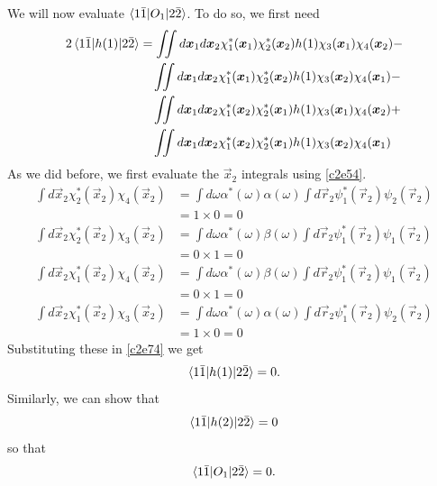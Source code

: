 We will now evaluate $\braket{1\bar{1}|O_1|2\bar{2}}$. To do so, we first need
\begin{equation}\label{c2e74}
\begin{aligned}
2\braket{1\bar{1}|h(1)|2\bar{2}} &= \iint d\bm{x}_1d\bm{x}_2
\chi_1^\ast(\bm{x}_1)\chi_2^\ast(\bm{x}_2)h(1)\chi_3(\bm{x}_1)\chi_4(\bm{x}_2)
- \\
 &\quad \iint d\bm{x}_1d\bm{x}_2
\chi_1^\ast(\bm{x}_1)\chi_2^\ast(\bm{x}_2)h(1)\chi_3(\bm{x}_2)\chi_4(\bm{x}_1)-
\\
 &\quad  \iint d\bm{x}_1d\bm{x}_2
\chi_1^\ast(\bm{x}_2)\chi_2^\ast(\bm{x}_1)h(1)\chi_3(\bm{x}_1)\chi_4(\bm{x}_2) +
\\
 &\quad  \iint d\bm{x}_1d\bm{x}_2
\chi_1^\ast(\bm{x}_2)\chi_2^\ast(\bm{x}_1)h(1)\chi_3(\bm{x}_2)\chi_4(\bm{x}_1)
\end{aligned}
\end{equation}
As we did before, we first evaluate the $\vec{x}_2$ integrals using \eqref{c2e54}.
\[
\begin{aligned}
\int d\vec{x}_2\chi_2^\ast(\vec{x}_2)\chi_4(\vec{x}_2) &= 
\int d\omega \alpha^\ast(\omega)\alpha(\omega)\int d\vec{r}_2\psi_1^\ast(\vec{r}_2)
\psi_2(\vec{r}_2) \\
 &= 1 \times 0 = 0 \\
\int d\vec{x}_2\chi_2^\ast(\vec{x}_2)\chi_3(\vec{x}_2) &= 
\int d\omega \alpha^\ast(\omega)\beta(\omega)\int d\vec{r}_2\psi_1^\ast(\vec{r}_2)
\psi_1(\vec{r}_2) \\
 &= 0 \times 1 = 0 \\
\int d\vec{x}_2\chi_1^\ast(\vec{x}_2)\chi_4(\vec{x}_2) &= 
\int d\omega \alpha^\ast(\omega)\beta(\omega)\int d\vec{r}_2\psi_1^\ast(\vec{r}_2)
\psi_1(\vec{r}_2) \\
 &= 0 \times 1 = 0 \\
\int d\vec{x}_2\chi_1^\ast(\vec{x}_2)\chi_3(\vec{x}_2) &= 
\int d\omega \alpha^\ast(\omega)\alpha(\omega)\int d\vec{r}_2\psi_1^\ast(\vec{r}_2)
\psi_2(\vec{r}_2) \\
 &= 1 \times 0 = 0 
\end{aligned}
\]
Substituting these in \eqref{c2e74} we get
\begin{equation}\label{c2e75}
\braket{1\bar{1}|h(1)|2\bar{2}} = 0.
\end{equation}
Similarly, we can show that
\begin{equation}\label{c2e76}
\braket{1\bar{1}|h(2)|2\bar{2}} = 0
\end{equation}
so that
\begin{equation}\label{c2e77}
\braket{1\bar{1}|O_1|2\bar{2}} = 0.
\end{equation}

